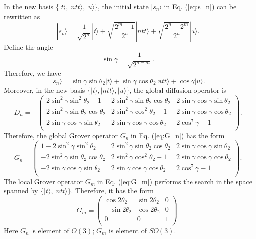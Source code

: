 \documentclass[a4paper,10pt]{article}
\numberwithin{equation}{section}
\begin{document}
In the new basis $\{|t\rangle,|ntt\rangle,|u\rangle\}$, the initial state $|s_n\rangle$ in Eq. (\ref{eq:s_n}) can be rewritten as
\begin{equation}
    |s_n\rangle = \frac{1}{\sqrt{2^n}}|t\rangle + \sqrt{\frac{2^m-1}{2^n}}|ntt\rangle + \sqrt{\frac{2^n-2^m}{2^n}}|u\rangle.
\end{equation}
Define the angle
\begin{equation}
    \sin\gamma = \frac{1}{\sqrt{2^{n-m}}}.
\end{equation}
Therefore, we have
\begin{equation}
    |s_n\rangle = \sin\gamma\sin\theta_2|t\rangle+\sin\gamma\cos\theta_2|ntt\rangle + \cos\gamma |u\rangle.
\end{equation}
Moreover, in the new basis $\{|t\rangle,|ntt\rangle,|u\rangle\}$, the global diffusion operator is
\begin{equation}
    D_n = -\begin{pmatrix}
        2\sin^2\gamma\sin^2\theta_2 - 1 & 2\sin^2\gamma\sin\theta_2\cos\theta_2 & 2\sin\gamma\cos\gamma\sin\theta_2 \\
        2\sin^2\gamma\sin\theta_2\cos\theta_2 & 2\sin^2\gamma\cos^2\theta_2 - 1 & 2\sin\gamma\cos\gamma\cos\theta_2 \\
        2\sin\gamma\cos\gamma\sin\theta_2 & 2\sin\gamma\cos\gamma\cos\theta_2 & 2\cos^2\gamma - 1 \\
        \end{pmatrix}.
\end{equation}
Therefore, the global Grover operator $G_n$ in Eq. (\ref{eq:G_n}) has the form
\begin{equation}
    G_n = \begin{pmatrix}
        1- 2\sin^2\gamma\sin^2\theta_2 & 2\sin^2\gamma\sin\theta_2\cos\theta_2 & 2\sin\gamma\cos\gamma\sin\theta_2 \\
        -2\sin^2\gamma\sin\theta_2\cos\theta_2 & 2\sin^2\gamma\cos^2\theta_2 - 1 & 2\sin\gamma\cos\gamma\cos\theta_2 \\
        -2\sin\gamma\cos\gamma\sin\theta_2 & 2\sin\gamma\cos\gamma\cos\theta_2 & 2\cos^2\gamma - 1 \\
        \end{pmatrix}.
\end{equation}
The local Grover operator $G_m$ in Eq. (\ref{eq:G_m}) performs the search in the space spanned by $\{|t\rangle,|ntt\rangle\}$. Therefore, it has the form
\begin{equation}
    G_m = \begin{pmatrix}
        \cos2\theta_2 & \sin2\theta_2 & 0 \\
        -\sin2\theta_2 & \cos2\theta_2 & 0 \\
        0 & 0 & 1 \\
    \end{pmatrix}.
\end{equation}
Here $G_n$ is element of $O(3)$; $G_m$ is element of $SO(3)$. 
\end{document}
